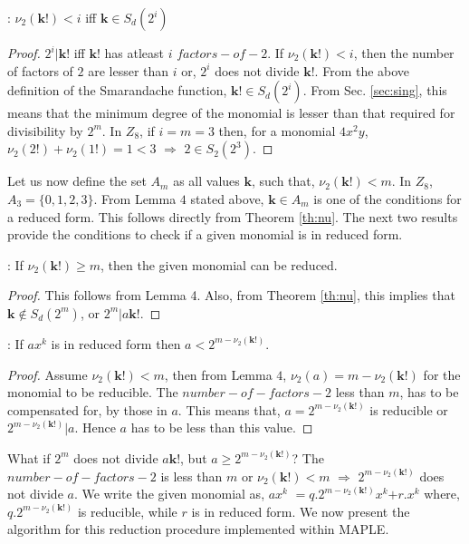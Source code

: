 \begin{theorem}: \label{th:nu} $\nu_2(\textbf{k!}) < i$ iff $\textbf{k} \in S_d(2^i)$
\end{theorem}
\begin{proof}
$2^i|\textbf{k!}$ iff $\textbf{k!}$ has atleast $i$ $factors-of-2$. If  $\nu_2(\textbf{k!}) < i$, then the number of factors
of $2$ are lesser than $i$ or, $2^i$ does not divide $\textbf{k!}$. From the above definition of the Smarandache function,
$\textbf{k!} \in S_d(2^i)$. From Sec. \ref{sec:sing}, this means that the minimum degree of the monomial is lesser than that
required for divisibility by $2^m$. In $Z_8$, if $i=m=3$ then, for a monomial $4x^2y$, $\nu_2(2!) + \nu_2(1!) = 1 < 3$ $\Rightarrow$ $2 \in S_2(2^3)$.
\end{proof}

Let us now define the set $A_m$ as all values $\textbf{k}$, such that, $\nu_2(\textbf{k!}) < m $. In $Z_8$, $A_3 = \{0,1,2,3\}$. From Lemma $4$ stated above, $\textbf{k} \in A_m$ is one of the conditions for a reduced form. This follows directly from Theorem \ref{th:nu}. The next two results provide the conditions to check if a given monomial is in reduced form.

\begin{theorem}: If $\nu_2(\textbf{k!}) \geq m$, then the given monomial can be reduced.
\end{theorem}
\begin{proof}
This follows from Lemma 4. Also, from Theorem \ref{th:nu}, this implies that $\textbf{k} \notin S_d(2^m)$, or $2^m | a\textbf{k!}$.
\end{proof}

\begin{theorem}: If $a$\textbf{$x^{k}$} is in reduced form then $a < 2^{m-\nu_2(\textbf{k!})}$.
\end{theorem}
\begin{proof}
Assume $\nu_2(\textbf{k!}) < m$, then from Lemma $4$, $\nu_2(a) = m - \nu_2(\textbf{k!})$ for the monomial to be reducible.
The $number-of-factors-2$ less than $m$, has to be compensated for, by those in $a$. This means that, $a =
2^{m-\nu_2(\textbf{k!})}$ is reducible or $2^{m-\nu_2(\textbf{k!})}|a$. Hence $a$ has to be less than this value.
\end{proof}

What if $2^m$ does not divide $a\textbf{k!}$, but $a \geq 2^{m-\nu_2(\textbf{k!})}$? The $number-of-factors-2$ is less than
$m$ or $\nu_2(\textbf{k!}) < m$ $\Rightarrow$ $2^{m-\nu_2(\textbf{k!})}$ does not divide $a$. We write the given monomial
as, $a$\textbf{$x^k$} $= q.2^{m-\nu_2(\textbf{k!})}$\textbf{$x^k$}$ + r.$\textbf{$x^k$} where, $q.2^{m-\nu_2(\textbf{k!})}$
is reducible, while $r$ is in reduced form. We now present the algorithm for this reduction procedure implemented within MAPLE.

